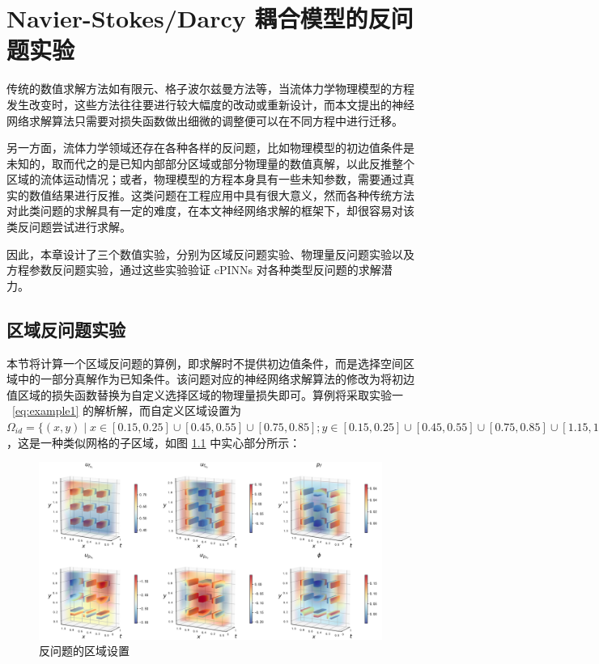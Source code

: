 
\chapter{Navier-Stokes/Darcy 耦合模型的反问题实验}
传统的数值求解方法如有限元、格子波尔兹曼方法等，当流体力学物理模型的方程发生改变时，这些方法往往要进行较大幅度的改动或重新设计，而本文提出的神经网络求解算法只需要对损失函数做出细微的调整便可以在不同方程中进行迁移。

另一方面，流体力学领域还存在各种各样的反问题，比如物理模型的初边值条件是未知的，取而代之的是已知内部部分区域或部分物理量的数值真解，以此反推整个区域的流体运动情况；或者，物理模型的方程本身具有一些未知参数，需要通过真实的数值结果进行反推。这类问题在工程应用中具有很大意义，然而各种传统方法对此类问题的求解具有一定的难度，在本文神经网络求解的框架下，却很容易对该类反问题尝试进行求解。

因此，本章设计了三个数值实验，分别为区域反问题实验、物理量反问题实验以及方程参数反问题实验，通过这些实验验证 cPINNs 对各种类型反问题的求解潜力。


\section{区域反问题实验}

本节将计算一个区域反问题的算例，即求解时不提供初边值条件，而是选择空间区域中的一部分真解作为已知条件。该问题对应的神经网络求解算法的修改为将初边值区域的损失函数替换为自定义选择区域的物理量损失即可。算例将采取实验一 ~\eqref{eq:example1} 的解析解，而自定义区域设置为 $\Omega_{id}= \{ (x,y) \mid x \in [0.15,0.25] \cup [0.45,0.55] \cup [0.75,0.85]; y \in [0.15,0.25] \cup [0.45,0.55] \cup [0.75,0.85] \cup [1.15,1.25] \cup [1.45,1.55] \cup [1.75,1.85]) \}$，这是一种类似网格的子区域，如图 \ref{fig:example_area_inverse} 中实心部分所示：

\begin{figure}[H]
    \centering
    \includegraphics[width=0.75\linewidth]{images/example_area_inverse.png}
    \caption{ 反问题的区域设置 }
    \label{fig:example_area_inverse}
\end{figure}

